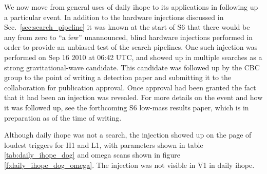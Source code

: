 We now move from general uses of daily ihope to its applications in
following up a particular event.  In addition to the hardware
injections discussed in Sec.~\ref{sec:search_pipeline} it was known at
the start of S6 that there would be any from zero to ``a few''
unannounced, blind hardware injections performed in order to provide
an unbiased test of the search pipelines.  One such injection was
performed on Sep 16 2010 at 06:42 UTC, and showed up in multiple
searches as a strong gravitational-wave candidate.  This candidate was
followed up by the CBC group to the point of writing a detection paper
and submitting it to the collaboration for publication approval.  Once
approval had been granted the fact that it had been an injection was
revealed.  For more details on the event and how it was followed up,
see the forthcoming S6 low-mass results paper, which is in preparation
as of the time of writing.

Although daily ihope was not a search, the injection showed up on the
page of loudest triggers for H1 and L1, with parameters shown in table
\ref{tab:daily_ihope_dog} and omega scans shown in figure
\ref{f:daily_ihope_dog_omega}.  The injection was not visible in V1 in
daily ihope.

